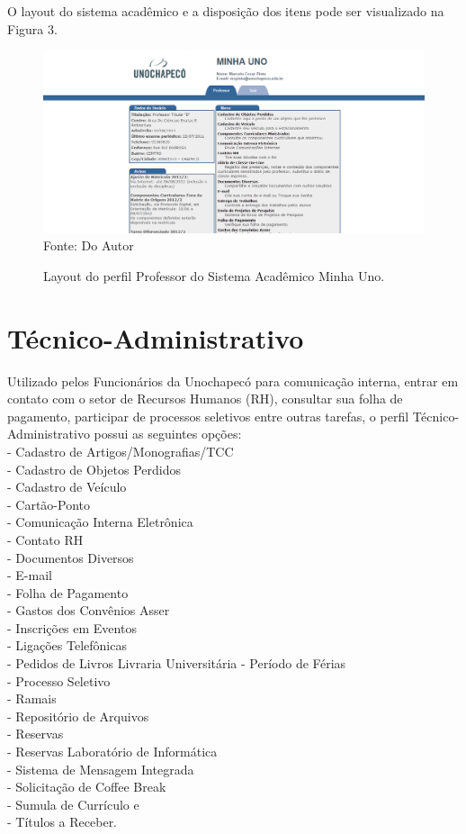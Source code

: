 O layout do sistema acadêmico e a disposição dos itens pode ser visualizado na Figura 3.


\begin{figure}[!htb]
     \centering
     \caption[Layout do Sistema - Perfil Professor]{Layout do perfil Professor do Sistema Acadêmico Minha Uno.}
     \includegraphics[scale=0.4]{imagens/professor.png}
     \\ Fonte: Do Autor
\end{figure}

\newpage

\section{Técnico-Administrativo}
Utilizado pelos Funcionários da Unochapecó para comunicação interna, entrar em contato com o setor de Recursos Humanos (RH),
consultar sua folha de pagamento, participar de processos seletivos entre outras tarefas, o perfil Técnico-Administrativo
possui as seguintes opções: \\
- Cadastro de Artigos/Monografias/TCC \\
- Cadastro de Objetos Perdidos \\
- Cadastro de Veículo \\
- Cartão-Ponto \\
- Comunicação Interna Eletrônica \\
- Contato RH \\
- Documentos Diversos \\
- E-mail \\
- Folha de Pagamento \\
- Gastos dos Convênios Asser \\
- Inscrições em Eventos \\
- Ligações Telefônicas \\
- Pedidos de Livros Livraria Universitária
- Período de Férias \\
- Processo Seletivo \\
- Ramais \\
- Repositório de Arquivos \\
- Reservas \\
- Reservas Laboratório de Informática \\
- Sistema de Mensagem Integrada \\
- Solicitação de Coffee Break \\
- Sumula de Currículo e \\
- Títulos a Receber. \\

